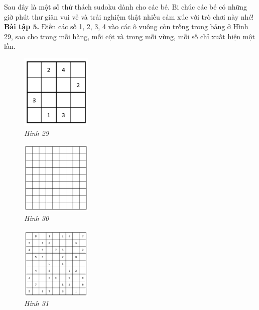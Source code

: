 	Sau đây là một số thử thách sudoku dành cho các bé. Bi chúc các bé có những giờ phút thư giãn vui vẻ và trải nghiệm thật nhiều cảm xúc với trò chơi này nhé!
	\vskip 0.15cm
	\textbf{Bài tập $\pmb{5}$.} Điền các số 1, 2, 3, 4 vào các ô vuông còn trống trong bảng ở Hình 29, sao cho trong mỗi hàng, mỗi cột và trong mỗi vùng, mỗi số chỉ xuất hiện một lần.
	\begin{multicols}{3}
		\begin{figure}[H]
			\centering
			\vspace*{-10pt}
			\captionsetup{labelformat= empty, justification=centering}
			\includegraphics[width=0.3\textwidth]{pic18}
			\vspace*{-5pt}
			\caption{\small\textit{Hình 29}}
			\vspace*{-10pt}
		\end{figure}
		\begin{figure}[H]
			\centering
			\vspace*{-10pt}
			\captionsetup{labelformat= empty, justification=centering}
			\includegraphics[width=0.3\textwidth]{pic21}
			\vspace*{-5pt}
			\caption{\small\textit{Hình 30}}
			\vspace*{-10pt}
		\end{figure}
		\begin{figure}[H]
			\centering
			\vspace*{-10pt}
			\captionsetup{labelformat= empty, justification=centering}
			\includegraphics[width=0.3\textwidth]{pic22}
			\vspace*{-5pt}
			\caption{\small\textit{ Hình 31}}
			\vspace*{-10pt}
		\end{figure}
	\end{multicols}
